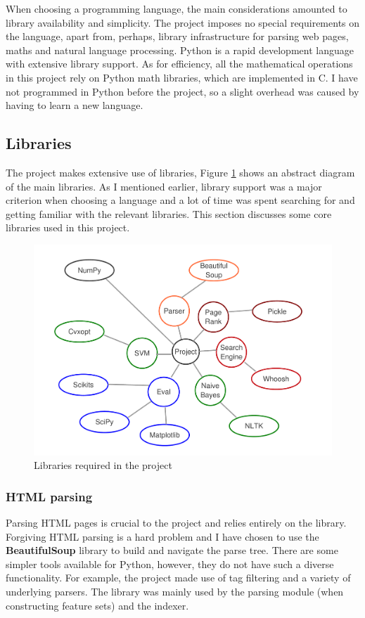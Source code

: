 \documentclass[12pt,a4paper,notitlepage,twoside]{scrbook}
\begin{document}
When choosing a programming language, the main considerations amounted to library availability
and simplicity. The project imposes no special requirements on the language, apart from,
perhaps, library infrastructure for parsing web pages, maths and natural language
processing.  Python is a rapid development language with extensive library support. As for
efficiency, all the mathematical operations in this project rely on Python math libraries,
which are implemented in C. I have not programmed in Python before the project, so a
slight overhead was caused by having to learn a new language.

\subsection{Libraries}
The project makes extensive use of libraries, Figure \ref{libs} shows an abstract diagram
of the main libraries. As I mentioned earlier, library support was a major criterion when
choosing a language and a lot of time was spent searching for and getting familiar with the
relevant libraries. This section discusses some core libraries used in this project.

\begin{figure}[h]
	\centering
	\includegraphics[width=\textwidth]{figs/libs.pdf}
	\caption{Libraries required in the project\label{libs}}
\end{figure}
\subsubsection*{HTML parsing}
Parsing HTML pages is crucial to the project and relies entirely on the library. Forgiving
HTML parsing is a hard problem and I have
chosen to use the \textbf{BeautifulSoup} library to build and navigate the parse tree.
There are some simpler tools available for Python, however, they do not have such a
diverse functionality. For example, the project made use of tag filtering and a
variety of underlying parsers. The library was mainly used by the parsing module (when
constructing feature sets) and the indexer.
\end{document}
